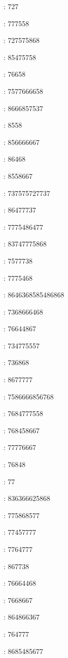 : 727\par
{}: 777558\par
{}: 727575868\par
{}: 85475758\par
{}: 76658\par
{}: 7577666658\par
{}: 8666857537\par
{}: 8558\par
{}: 856666667\par
{}: 86468\par
{}: 8558667\par
{}: 737575727737\par
{}: 86477737\par
{}: 7775486477\par
{}: 83747775868\par
{}: 7577738\par
{}: 7775468\par
{}: 8646368585486868\par
{}: 7368666468\par
{}: 76644867\par
{}: 734775557\par
{}: 736868\par
{}: 8677777\par
{}: 7586666856768\par
{}: 7684777558\par
{}: 768458667\par
{}: 77776667\par
{}: 76848\par
{}: 77\par
{}: 836366625868\par
{}: 775868577\par
{}: 77457777\par
{}: 7764777\par
{}: 867738\par
{}: 76664468\par
{}: 7668667\par
{}: 864866367\par
{}: 764777\par
{}: 8685485677\par
